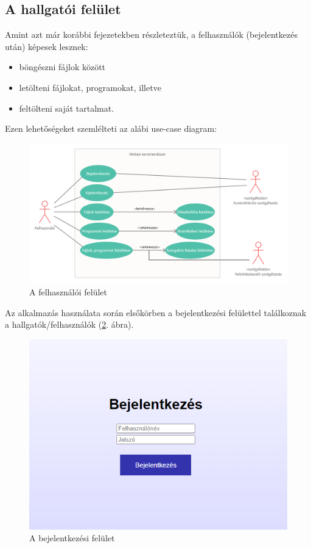 
\subsection{A hallgatói felület}

Amint azt már korábbi fejezetekben részleteztük, a felhasználók (bejelentkezés után) képesek lesznek:

\begin{itemize}
\item{böngészni fájlok között}
\item{letölteni fájlokat, programokat, illetve}
\item{feltölteni saját tartalmat.}
\end{itemize}

Ezen lehetőségeket szemlélteti az alábi use-case diagram:

\begin{figure}[h]
	\centering
		\includegraphics[width=10truecm, height=7truecm]{images/felhasznalo_use_case.png}
	\caption{A felhasználói felület}
	\label{fig:login}
\end{figure}

Az alkalmazás használata során elsőkörben a bejelentkezési felülettel találkoznak a hallgatók/felhasználók (\ref{fig:login}. ábra). 

\begin{figure}[h]
	\centering
		\includegraphics[width=10truecm, height=7truecm]{images/bejelentkezes.png}
	\caption{A bejelentkezési felület}
	\label{fig:login}
\end{figure}

